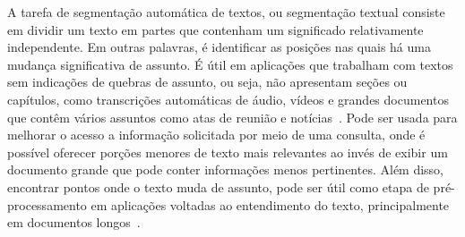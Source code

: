 















A tarefa de segmentação automática de textos, ou segmentação textual consiste em dividir um texto em partes que contenham um significado relativamente independente. Em outras palavras, é identificar as posições nas quais há uma mudança significativa de assunto. É útil em aplicações que trabalham com textos sem indicações de quebras de assunto, ou seja, não apresentam seções ou capítulos, como transcrições automáticas de áudio, vídeos e grandes documentos que contêm vários assuntos como atas de reunião e notícias~\cite{Aggarwal2018, bokaei2015, sakahara2014, misra2009, eisenstein2008, choi2000}.
Pode ser usada para melhorar o acesso a informação solicitada por meio de uma consulta, onde é possível oferecer porções menores de texto mais relevantes ao invés de exibir um documento grande que pode conter informações menos pertinentes.  Além disso, encontrar pontos onde o texto muda de assunto, pode ser útil como etapa de pré-processamento em aplicações voltadas ao entendimento do texto, principalmente em documentos longos~\cite{Choi2000}.


